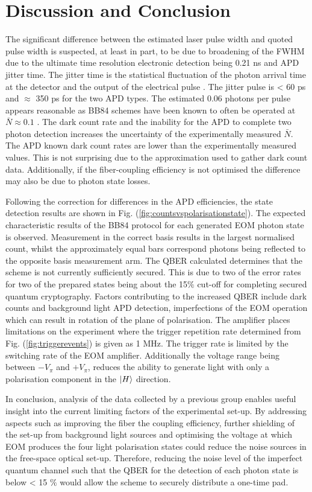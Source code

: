 \section{\label{sec:level1}Discussion and Conclusion}
The significant difference between the estimated laser pulse width and quoted pulse width is suspected, at least in part, to be due to broadening of the FWHM due to the ultimate time resolution electronic detection being 0.21 ns and APD jitter time. The jitter time is the statistical fluctuation of the photon arrival time at the detector and the output of the electrical pulse \citep{Jani2007TimingCircuitry}. The jitter pulse is < 60 ps and $\approx$ 350 ps for the two APD types. The estimated 0.06 photons per pulse appears reasonable as BB84 schemes have been known to often be operated at $\bar{N}\approx0.1$ \citep{Fox2006QuantumIntroduction}. The dark count rate and the inability for the APD to complete two photon detection increases the uncertainty of the experimentally measured $\bar{N}$. The APD known dark count rates are lower than the experimentally measured values. This is not surprising due to the approximation used to gather dark count data. Additionally, if the fiber-coupling efficiency is not optimised the difference may also be due to photon state losses. 

Following the correction for differences in the APD efficiencies, the state detection results are shown in Fig. (\ref{fig:countsvspolarisationstate}). The expected characteristic results of the BB84 protocol for each generated EOM photon state is observed. Measurement in the correct basis results in the largest normalised count, whilst the approximately equal bars correspond photons being reflected to the opposite basis measurement arm. The QBER calculated determines that the scheme is not currently sufficiently secured. This is due to two of the error rates for two of the prepared states being about the 15$\%$ cut-off for completing secured quantum cryptography. Factors contributing to the increased QBER include dark counts and background light APD detection, imperfections of the EOM operation which can result in rotation of the plane of polarisation. The amplifier places limitations on the experiment where the trigger repetition rate determined from Fig. (\ref{fig:triggerevents}) is given as 1 MHz. The trigger rate is limited by the switching rate of the EOM amplifier. Additionally the voltage range being between $-V_{\pi}$ and $+V_{\pi}$, reduces the ability to generate light with only a polarisation component in the $\lvert H\rangle$ direction. 

In conclusion, analysis of the data collected by a previous group enables useful insight into the current limiting factors of the experimental set-up. By addressing aspects such as improving the fiber the coupling efficiency, further shielding of the set-up from background light sources and optimising the voltage at which EOM produces the four light polarisation states could reduce the noise sources in the free-space optical set-up. Therefore, reducing the noise level of the imperfect quantum channel such that the QBER for the detection of each photon state is below < 15 $\%$ would allow the scheme to securely distribute a one-time pad.



